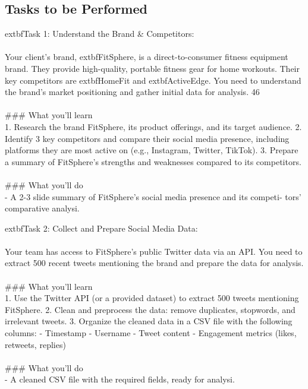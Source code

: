 \documentclass{article}
\begin{document}
\subsection*{Tasks to be Performed}
	extbf{Task 1:} Understand the Brand & Competitors:  \\
 \\
 Your client’s brand, 	extbf{FitSphere}, is a direct-to-consumer fitness equipment brand. They provide high-quality, portable fitness gear for home workouts. Their key competitors are 	extbf{HomeFit} and 	extbf{ActiveEdge}. You need to understand the brand’s market positioning and gather initial data for analysis. 46 \\
 \\
### What you'll learn \\
1. Research the brand FitSphere, its product offerings, and its target audience. 2. Identify 3 key competitors and compare their social media presence, including platforms they are most active on (e.g., Instagram, Twitter, TikTok). 3. Prepare a summary of FitSphere’s strengths and weaknesses compared to its competitors. \\
 \\
### What you'll do \\
- A 2-3 slide summary of FitSphere’s social media presence and its competi- tors’ comparative analysi.

	extbf{Task 2:} Collect and Prepare Social Media Data:  \\
 \\
 Your team has access to FitSphere’s public Twitter data via an API. You need to extract 500 recent tweets mentioning the brand and prepare the data for analysis. \\
 \\
### What you'll learn \\
1. Use the Twitter API (or a provided dataset) to extract 500 tweets mentioning FitSphere. 2. Clean and preprocess the data: remove duplicates, stopwords, and irrelevant tweets. 3. Organize the cleaned data in a CSV file with the following columns: - Timestamp - Username - Tweet content - Engagement metrics (likes, retweets, replies) \\
 \\
### What you'll do \\
- A cleaned CSV file with the required fields, ready for analysi.
\end{document}
